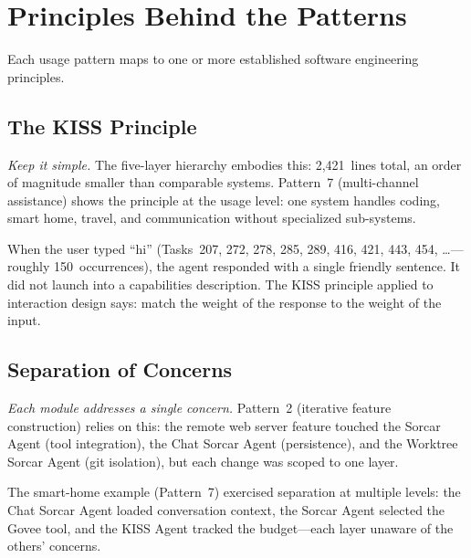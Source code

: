 \documentclass{article}
\begin{document}
\section{Principles Behind the Patterns}
\label{sec:principles}

Each usage pattern maps to one or more established software
engineering principles.

\subsection{The KISS Principle}
\label{sec:kiss}

\emph{Keep it simple.}
The five-layer hierarchy embodies this: 2,421~lines total,
an order of magnitude smaller than comparable systems.
Pattern~7 (multi-channel assistance) shows the principle at the
usage level: one system handles coding, smart home, travel, and
communication without specialized sub-systems.

When the user typed ``hi'' (Tasks~207, 272, 278, 285, 289, 416,
421, 443, 454, \ldots---roughly 150~occurrences), the agent
responded with a single friendly sentence.
It did not launch into a capabilities description.
The KISS principle applied to interaction design says: match the
weight of the response to the weight of the input.

\subsection{Separation of Concerns}
\label{sec:separation}

\emph{Each module addresses a single concern.}
Pattern~2 (iterative feature construction) relies on this:
the remote web server feature touched the Sorcar Agent
(tool integration), the Chat Sorcar Agent (persistence), and the
Worktree Sorcar Agent (git isolation), but each change was scoped
to one layer.

The smart-home example (Pattern~7) exercised separation at
multiple levels: the Chat Sorcar Agent loaded conversation context,
the Sorcar Agent selected the Govee tool, and the KISS Agent
tracked the budget---each layer unaware of the others' concerns.
\end{document}
